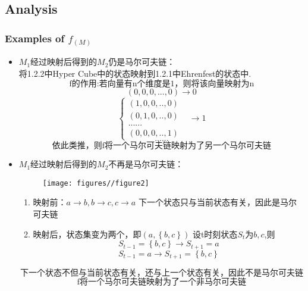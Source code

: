 \documentclass[a4paper, 11pt]{article} %
\begin{document}
\subsection{Analysis}
\begin{small}
\subsubsection{Examples of $f_{(M)}$}
\begin{itemize}
	\item $M_1$经过映射后得到的$M_2$仍是马尔可夫链：
	\\ 将1.2.2中Hyper Cube中的状态映射到1.2.1中Ehrenfest的状态中.
	$$\mbox{f的作用:若向量有n个维度是1，则将该向量映射为n}$$
	$$(0,0,0,...,0)\rightarrow0$$
	\begin{equation}  
           \left\{  
             \begin{array}{lr}  
              (1,0,0,..,0)&  \\  
             (0,1,0,..,0) &  \\ 
             ......& \\
             (0,0,0,..,1)
            \end{array}  
         \right.  
         \rightarrow 1
      \end{equation}
      $$\mbox{......}$$
       $$\mbox{依此类推，则f将一个马尔可夫链映射为了另一个马尔可夫链}$$

	\item $M_1$经过映射后得到的$M_2$不再是马尔可夫链：
	\begin{figure}[h]
    	\centering
    	\texttt{[image: figures//figure2]}
    \end{figure}
    \begin{enumerate}
    	\item 映射前：$a\rightarrow b,b\rightarrow c,c\rightarrow a$
    	下一个状态只与当前状态有关，因此是马尔可夫链
    	\item 映射后，状态集变为两个，即$(a,\left\{b,c\right\})$
    	设t时刻状态$S_t$为${b,c}$,则
    	$$
    	 S_{t-1}=\left\{b,c\right\}\rightarrow S_{t+1}=a
    	$$
    	$$
         S_{t-1}=a\rightarrow S_{t+1}=\left\{b,c\right\}
    	$$

    \end{enumerate}
    $$\mbox{下一个状态不但与当前状态有关，还与上一个状态有关，因此不是马尔可夫链}$$
    $$\mbox{f将一个马尔可夫链映射为了一个非马尔可夫链}$$
\end{itemize}

\end{small}
\end{document}
